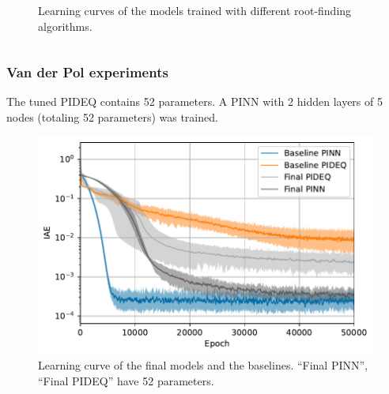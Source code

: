 \documentclass[t]{beamer}
\begin{document}
\begin{frame}
\begin{columns}[c]
\begin{column}{.6\textwidth}
{\begin{figure}[h]
            \caption{Learning curves of the models trained with different root-finding algorithms.}
            \label{fig:solver-iae}
	\end{figure}}
    \end{column}
    \end{columns}
\end{frame}

\begin{frame}
    \frametitle{Van der Pol experiments}
    The tuned PIDEQ contains 52 parameters. A PINN with 2 hidden layers of 5 nodes (totaling 52 parameters) was trained.
    \begin{figure}[h]
	\centering
	\includegraphics[width=.6\textwidth]{../images/final_iae.pdf}
	\caption{Learning curve of the final models and the baselines. ``Final PINN'', ``Final PIDEQ'' have 52 parameters.}
	\label{fig:final-iae}
    \end{figure}
\end{frame}
\end{document}
